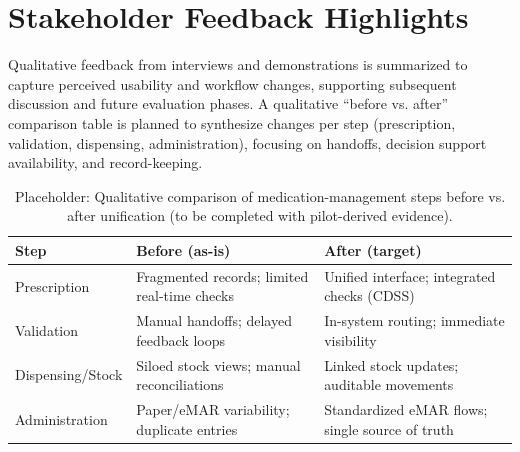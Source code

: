 \section{Stakeholder Feedback Highlights}
Qualitative feedback from interviews and demonstrations is summarized to capture perceived usability and workflow changes, supporting subsequent discussion and future evaluation phases. A qualitative “before vs. after” comparison table is planned to synthesize changes per step (prescription, validation, dispensing, administration), focusing on handoffs, decision support availability, and record-keeping.

\begin{table}[H]
    \centering
    \caption{Placeholder: Qualitative comparison of medication-management steps before vs. after unification (to be completed with pilot-derived evidence).}
    \label{tab:before_after_qualitative}
    \begin{tabularx}{\textwidth}{@{}l|X|X@{}}
        \toprule
        \textbf{Step} & \textbf{Before (as-is)} & \textbf{After (target)} \\
        \midrule
        Prescription & Fragmented records; limited real-time checks & Unified interface; integrated checks (CDSS) \\
        Validation & Manual handoffs; delayed feedback loops & In-system routing; immediate visibility \\
        Dispensing/Stock & Siloed stock views; manual reconciliations & Linked stock updates; auditable movements \\
        Administration & Paper/eMAR variability; duplicate entries & Standardized eMAR flows; single source of truth \\
        \bottomrule
    \end{tabularx}
\end{table}


